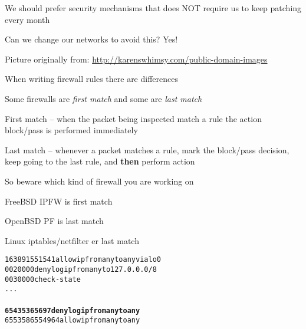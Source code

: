 \documentclass[Screen16to9,17pt]{foils}
\begin{document}



\begin{list2}
\item We should prefer security mechanisms that does NOT require us to keep patching every month
\item Can we change our networks to avoid this? Yes!
\end{list2}



\centerline{Picture originally from: \url{http://karenswhimsy.com/public-domain-images}}




\begin{list1}
\item When writing firewall rules there are differences
\item Some firewalls are \emph{first match} and some are \emph{last match}
\begin{list2}
\item First match -- when the packet being inspected match a rule the action block/pass is performed immediately
\item  Last match  -- whenever a packet matches a rule, mark the block/pass decision, keep going to the last rule, and {\bf then} perform action
\end{list2}
\item So beware which kind of firewall you are working on
\item FreeBSD IPFW is first match
\item OpenBSD PF is last match
\item Linux iptables/netfilter er last match
\end{list1}






\begin{alltt}
 16389  1551541 allow ip from any to any via lo0
00200     0        0 deny log ip from any to 127.0.0.0/8
00300     0        0 check-state
...
{\bfseries
65435    36     5697 deny log ip from any to any}
65535   865    54964 allow ip from any to any
\end{alltt}
\end{document}
